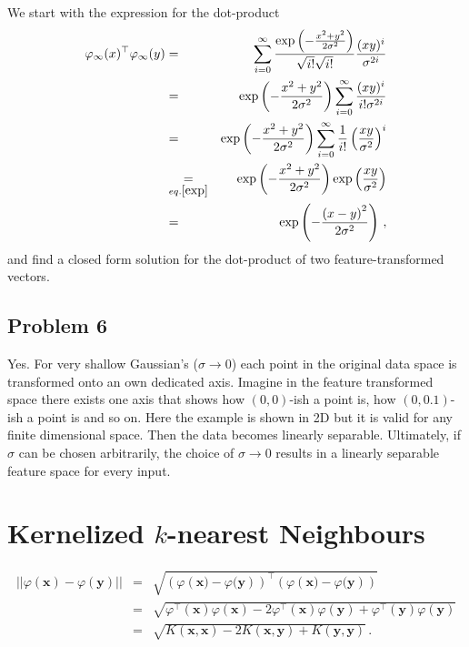 \documentclass{scrartcl}
\begin{document}
We start with the expression for the dot-product
\begin{eqnarray}
	\varphi_\infty (x)^\top \varphi_\infty (y) &=& \sum\limits_{i=0}^\infty \frac{\exp\left(-\frac{x^2+y^2}{2 \sigma^2}\right)}{\sqrt{i!}\sqrt{i!}} \frac{(xy)^i}{\sigma ^{2i}}\\
	&=& \exp\left(-\frac{x^2+y^2}{2 \sigma^2}\right) \sum\limits_{i=0}^{\infty}\frac{(xy)^i}{i! \sigma^{2i}}\\
	&=& \exp\left(-\frac{x^2+y^2}{2 \sigma^2}\right) \sum\limits_{i=0}^{\infty} \frac{1}{i!}\left(\frac{xy}{\sigma^2}\right)^i\\
	&\underset{eq. \ref{exp}}{=}&  \exp\left(-\frac{x^2+y^2}{2 \sigma^2}\right)\exp\left(\frac{xy}{\sigma^2}\right)\\
	&=& \exp \left(-\frac{\left(x - y\right)^2}{2 \sigma^2}\right) \, ,
\end{eqnarray}
and find a closed form solution for the dot-product of two feature-transformed vectors.

\subsection{Problem 6}
Yes. For very shallow Gaussian's ($\sigma \rightarrow 0$) each point in the original data space is transformed onto an own dedicated axis. Imagine in the feature transformed space there exists one axis that shows how $(0, 0)$-ish a point is, how $(0, 0.1)$-ish a point is and so on. Here the example is shown in 2D but it is valid for any finite dimensional space. Then the data becomes linearly separable. Ultimately, if $\sigma$ can be chosen arbitrarily, the choice of $\sigma \rightarrow 0$ results in a linearly separable feature space for every input.

\section{Kernelized $k$-nearest Neighbours}
\begin{eqnarray}
|| \varphi (\mathbf{x}) - \varphi(\mathbf{y}) || &=& \sqrt{\left(\varphi\left(\mathbf{x}) - \varphi(\mathbf{y}\right)\right)^\top \left(\varphi\left(\mathbf{x}) - \varphi(\mathbf{y}\right)\right)}\\	
&=& \sqrt{\varphi^\top (\mathbf{x})\varphi(\mathbf{x}) - 2\varphi^\top (\mathbf{x}) \varphi(\mathbf{y}) + \varphi^\top(\mathbf{y}) \varphi(\mathbf{y})}\\
&=& \sqrt{K(\mathbf{x}, \mathbf{x}) - 2K(\mathbf{x}, \mathbf{y}) + K(\mathbf{y}, \mathbf{y})} \, .
\end{eqnarray}
\end{document}

